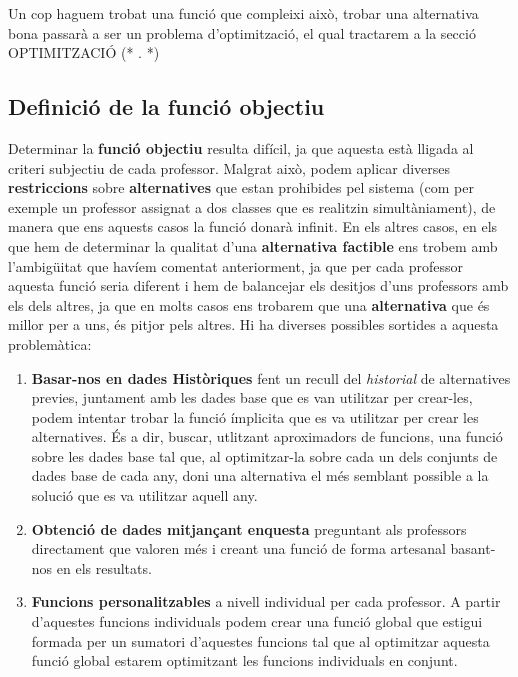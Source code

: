 \documentclass[10pt,twocolumn]{article}
\newcommand{\nehh}[1]{\color{magenta} (* {#1} *) \normalcolor }
\begin{document}
Un cop haguem trobat una funció que compleixi això, trobar una alternativa bona passarà a ser un problema d'optimització, el qual tractarem a la secció OPTIMITZACIÓ \nehh.
\\
\subsection{Definició de la funció objectiu}
Determinar la \textbf{funció objectiu} resulta difícil, ja que aquesta està lligada al criteri subjectiu de cada professor. Malgrat això, podem aplicar diverses \textbf{restriccions} sobre \textbf{alternatives} que estan prohibides pel sistema (com per exemple un professor assignat a dos classes que es realitzin simultàniament), de manera que ens aquests casos la funció donarà infinit. En els altres casos, en els que hem de determinar la qualitat d'una \textbf{alternativa factible} ens trobem amb l'ambigüitat que havíem comentat anteriorment, ja que per cada professor aquesta funció seria diferent i hem de balancejar els desitjos d'uns professors amb els dels altres, ja que en molts casos ens trobarem que una \textbf{alternativa} que és millor per a uns, és pitjor pels altres. Hi ha diverses possibles sortides a aquesta problemàtica:
\begin{enumerate}
	\item \textbf{Basar-nos en dades Històriques} fent un recull del \textit{historial}  de alternatives previes, juntament amb les dades base que es van utilitzar per crear-les, podem intentar trobar la funció ímplicita que es va utilitzar per crear les alternatives. És a dir, buscar, utlitzant aproximadors de funcions, una funció sobre les dades base tal que, al optimitzar-la sobre cada un dels conjunts de dades base de cada any, doni una alternativa el més semblant possible a la solució que es va utilitzar aquell any. 
	\item \textbf{Obtenció de dades mitjançant enquesta} preguntant als professors directament que valoren més i creant una funció de forma artesanal basant-nos en els resultats.
	\item \textbf{Funcions personalitzables} a nivell individual per cada professor. A partir d'aquestes funcions individuals podem crear una funció global que estigui formada per un sumatori d'aquestes funcions tal que al optimitzar aquesta funció global estarem optimitzant les funcions individuals en conjunt.
\end{enumerate} 
\end{document}
